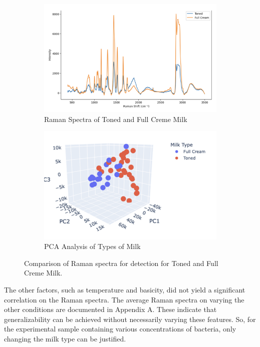 \begin{figure}[htbp]
  \centering
  \begin{subfigure}[b]{0.45\textwidth}
    \centering
    \includegraphics[width=\textwidth]{Figures/TonedFC.png}
    \caption{Raman Spectra of Toned and Full Creme Milk}
    \label{fig: tonedfc}
  \end{subfigure}
  \hfill
  \begin{subfigure}[b]{0.45\textwidth}
    \centering
    \includegraphics[width=\textwidth]{Figures/PCA_tonedFC.png}
    \caption{PCA Analysis of Types of Milk}
    \label{fig:pcatonedfc}
  \end{subfigure}
  \caption{Comparison of Raman spectra for detection for Toned and Full Creme Milk.}
  \label{fig:combined2}
\end{figure}

\noindent The other factors, such as temperature and basicity, did not yield a significant correlation on the Raman spectra. The average Raman spectra on varying the other conditions are documented in Appendix A. These indicate that generalizability can be achieved without necessarily varying these features. So, for the experimental sample containing various concentrations of bacteria, only changing the milk type can be justified. \\

